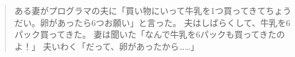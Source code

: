 \begin{quote}
	ある妻がプログラマの夫に「買い物にいって牛乳を1つ買ってきてちょうだい。卵があったら6つお願い」と言った。
	夫はしばらくして、牛乳を6パック買ってきた。
	妻は聞いた「なんで牛乳を6パックも買ってきたのよ！」
	夫いわく「だって、卵があったから……」
\end{quote}
